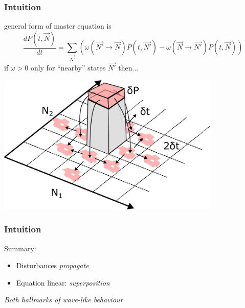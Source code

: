 \documentclass{beamer}
\begin{document}
\begin{frame}
    \frametitle{Intuition}
    general form of master equation is
    \begin{equation}
        \frac{dP(t, \vec{N})}{dt} = \sum_{\vec{N'}} \left(
        \omega(\vec{N'} \rightarrow \vec{N}) P(t, \vec{N'})
        - \omega(\vec{N} \rightarrow \vec{N'}) P(t, \vec{N})
        \right)
    \end{equation}
    if $\omega > 0$ only for ``nearby'' states $\vec{N'}$ then...

    \includegraphics[width=0.8\textwidth]{figures/intuition4}
\end{frame}

\begin{frame}
    \frametitle{Intuition}
    Summary:
    \begin{itemize}
        \item Disturbances \emph{propagate}
        \item Equation linear: \emph{superposition}
    \end{itemize}

    \;

    \emph{Both hallmarks of wave-like behaviour}
\end{frame}
\end{document}
